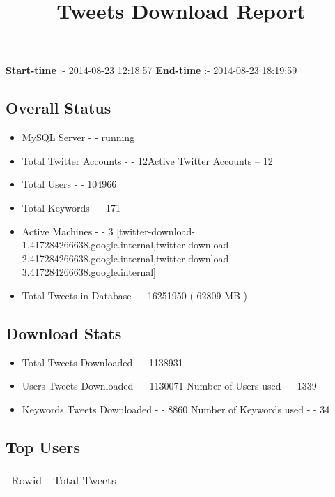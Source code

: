 \documentclass{article}\usepackage[T1]{fontenc}
\begin{document}
\title{\textbf{Tweets Download Report}}
               \date{}
                \maketitle
               \centerline{\textbf{Start-time} :- 2014-08-23 12:18:57 \hspace{40pt} \textbf{End-time} :- 2014-08-23 18:19:59}               \subsection*{Overall Status}                \begin{itemize}                \item MySQL Server - - running               \item Total Twitter Accounts - - 12\newline Active Twitter Accounts -- 12               \item Total Users - - 104966               \item Total Keywords - - 171               \item Active Machines - - 3 [twitter-download-1.417284266638.google.internal,twitter-download-2.417284266638.google.internal,twitter-download-3.417284266638.google.internal]               \item Total Tweets in Database - - 16251950 ( 62809 MB )               \end{itemize}               \subsection*{Download Stats}                \begin{itemize}                \item Total Tweets Downloaded - - 1138931               \item Users Tweets Downloaded - - 1130071 \newline Number of Users used - - 1339               \item Keywords Tweets Downloaded - - 8860 \newline Number of Keywords used - - 34              \end{itemize}              \subsection*{Top Users}\begin{tabular}{|c|c|c|}         \hline         Rowid & Total Tweets \\ 

\end{tabular}
\end{document}
